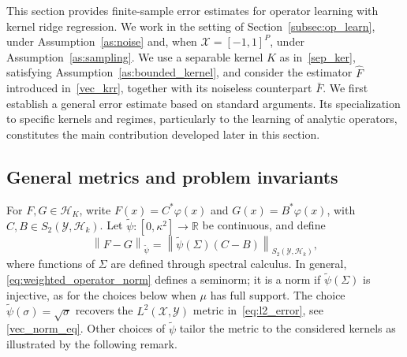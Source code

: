 \documentclass[11pt]{article}
\numberwithin{equation}{section}
\theoremstyle{plain}
\theoremstyle{definition}
\theoremstyle{remark}
\newcommand{\X}{\mathcal{X}}
\newcommand{\Hs}{\mathcal{H}}
\newcommand{\Y}{\mathcal{Y}}
\newcommand{\norm}[1]{\left\lVert#1\right\rVert}
\newcommand{\tpsi}{\widetilde{\psi}}
\begin{document}
This section provides finite-sample error estimates for operator learning with
kernel ridge regression. We work in the setting of
Section~\ref{subsec:op_learn}, under Assumption~\ref{as:noise} and, when
$\mathcal{X}=[-1,1]^P$, under Assumption~\ref{as:sampling}. We use a separable
kernel $K$ as in~\eqref{sep_ker}, satisfying Assumption~\ref{as:bounded_kernel},
and consider the estimator $\hat{F}$ introduced in~\eqref{vec_krr}, together
with its noiseless counterpart $\bar{F}$. We first establish a general error
estimate based on standard arguments. Its specialization to specific kernels
and regimes, particularly to the learning of analytic operators, constitutes
the main contribution developed later in this section.

\subsection{General metrics and problem invariants}
\label{subsec:operator_quantities}

For $F,G\in\Hs_K$, write
$F(x)=C^*\varphi(x)$ and $G(x)=B^*\varphi(x)$, with
$C,B\in S_2(\Y,\Hs_k)$. Let
$\tpsi\colon[0,\kappa^2]\to\mathbb{R}$ be continuous, and define
\begin{equation}
\label{eq:weighted_operator_norm}
\norm{F-G}_{\tpsi}
=
\norm{\tpsi(\Sigma)(C-B)}_{S_2(\Y,\Hs_k)},
\end{equation}
where functions of $\Sigma$ are defined through  spectral calculus. In general, \eqref{eq:weighted_operator_norm} defines a seminorm; it is a norm if $\tpsi(\Sigma)$ is injective, as for the choices below when $\mu$ has full support. The
choice $\tpsi(\sigma)=\sqrt{\sigma}$ recovers the
$L^2(\X,\Y)$ metric  in~\eqref{eq:l2_error}, see \eqref{vec_norm_eq}. Other
choices of $\tpsi$ tailor the metric to the considered kernels as illustrated by the following remark.
\end{document}
